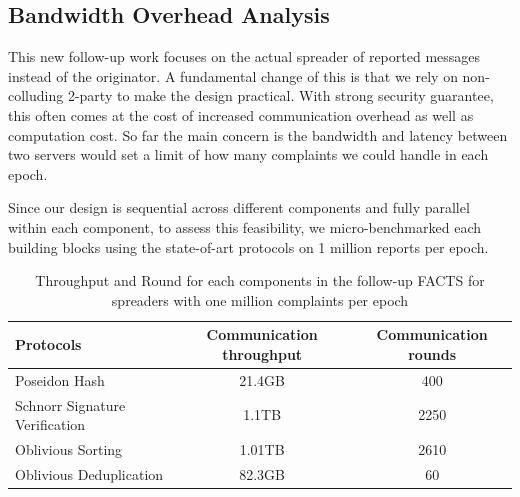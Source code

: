 \subsection{Bandwidth Overhead Analysis}
This new follow-up work focuses on the actual spreader of reported messages instead of the originator. A fundamental change of this is that we rely on non-colluding 2-party to make the design practical. With strong security guarantee, this often comes at the cost of increased communication overhead as well as computation cost. So far the main concern is the bandwidth and latency between two servers would set a limit of how many complaints we could handle in each epoch. 

Since our design is sequential across different components and fully parallel within each component, to assess this feasibility, we micro-benchmarked each building blocks using the state-of-art protocols on 1 million reports per epoch.  


\begin{table}[h!]
    \centering
    \begin{tabular}{|l|c|c|}
        \hline
        \textbf{Protocols} & \textbf{Communication throughput} & \textbf{Communication rounds} \\
        \hline
        Poseidon Hash & 21.4GB & 400 \\
        Schnorr Signature Verification & 1.1TB & 2250 \\
        Oblivious Sorting & 1.01TB & 2610 \\
        Oblivious Deduplication & 82.3GB & 60 \\
        \hline
    \end{tabular}
    \caption{Throughput and Round for each components in the follow-up FACTS for spreaders with one million complaints per epoch}
    \label{tab:bandwidth}
\end{table}

